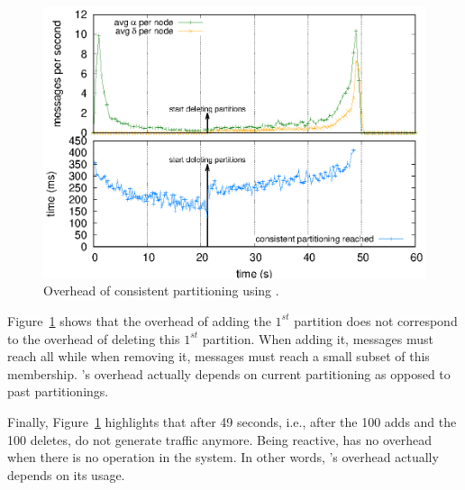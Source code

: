 \begin{asparadesc}
\begin{figure}
  \centering\includegraphics[width=0.99\columnwidth]{img/as_cast_complexity.eps}
  \caption{\label{fig:complexity}Overhead of consistent partitioning
    using \NAME.}
\end{figure}

\noindent Figure~\ref{fig:complexity} shows that the overhead of
adding the $1^{st}$ partition does not correspond to the overhead of
deleting this $1^{st}$ partition. When adding it, messages must reach
all \processes while when removing it, messages must reach a small
subset of this membership.  \NAME's overhead actually depends on
current partitioning as opposed to past partitionings.

\noindent Finally, Figure~\ref{fig:complexity} highlights that after
49 seconds, i.e., after the 100 adds and the 100 deletes, \processes
do not generate traffic anymore. Being reactive, \NAME has no overhead
when there is no operation in the system. In other words, \NAME's
overhead actually depends on its usage.

\end{asparadesc}


